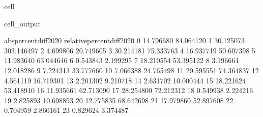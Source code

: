 \documentclass[letterpaper,10pt,english]{jupyterBook}
\begin{document}
\begin{sphinxuseclass}{cell}
\begin{sphinxVerbatimOutput}
\begin{sphinxuseclass}{cell_output}
\begin{sphinxVerbatim}[commandchars=\\\{\}]
    abs\PYGZus{}percent\PYGZus{}diff\PYGZus{}2020  relative\PYGZus{}percent\PYGZus{}diff\PYGZus{}2020  
0               14.796680                  \PYGZhy{}84.064120  
1               30.125073                 \PYGZhy{}303.146497  
2                4.699806                  \PYGZhy{}20.749605  
3               30.214181                   75.333763  
4               16.937719                   50.607398  
5               11.983640                  \PYGZhy{}63.044646  
6                0.543843                   \PYGZhy{}2.199295  
7               18.210554                   53.395122  
8                3.196664                   12.018286  
9                7.224313                  \PYGZhy{}33.777660  
10               7.066388                   24.765498  
11              29.595551                   74.364837  
12               4.561119                   16.719301  
13               2.201302                   \PYGZhy{}9.210718  
14               2.631702                   10.000444  
15              18.221624                   53.418910  
16              11.935661                  \PYGZhy{}62.713090  
17              28.254800                   72.212312  
18               0.549938                   \PYGZhy{}2.224216  
19               2.825893                   10.698893  
20              12.775835                  \PYGZhy{}68.642698  
21              17.979860                   52.897608  
22               0.704959                   \PYGZhy{}2.860161  
23               0.829624                   \PYGZhy{}3.374487  
\end{sphinxVerbatim}

\end{sphinxuseclass}\end{sphinxVerbatimOutput}

\end{sphinxuseclass}
\end{document}

